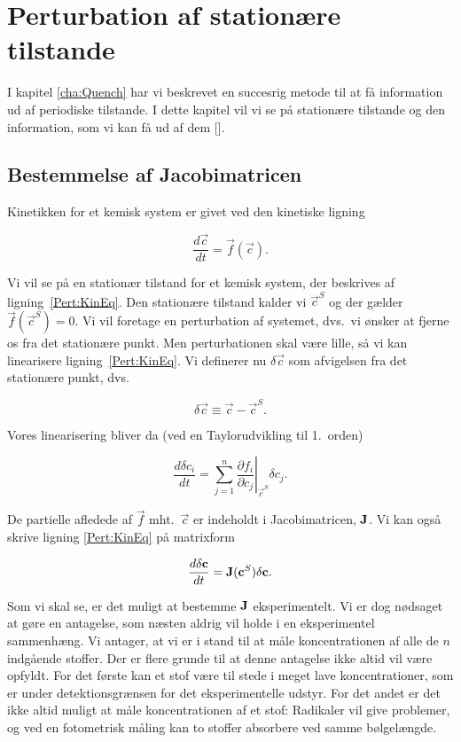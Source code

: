 \chapter{Perturbation af station{\ae}re tilstande}
\label{cha:PertStat}
I kapitel \ref{cha:Quench} har vi beskrevet en succesrig
metode til at f{\aa} information ud af periodiske
tilstande. I dette kapitel vil vi se p{\aa} station{\ae}re
tilstande og den information, som vi kan f{\aa} ud af dem
[].

\section{Bestemmelse af Jacobimatricen}
\label{Pert:jac}
Kinetikken for et kemisk system er givet ved den kinetiske
ligning

\begin{equation}
  \frac{d {\vec{c}} }{dt} = \vec{f}( \vec{c} ).
  \label{Pert:KinEq}
\end{equation}

Vi vil se p{\aa} en station{\ae}r tilstand for et kemisk
system, der beskrives af ligning~\ref{Pert:KinEq}. Den
station{\ae}re tilstand kalder vi $\vec{c}^S$ og der g{\ae}lder
$\vec{f}( \vec{c} ^S) = 0$. Vi vil foretage en perturbation af
systemet, dvs.\ vi {\o}nsker at fjerne os fra det
station{\ae}re punkt. Men perturbationen skal v{\ae}re
lille, s{\aa} vi kan linearisere ligning~\ref{Pert:KinEq}. Vi
definerer nu $\delta \vec{c}$ som afvigelsen fra det
station{\ae}re punkt, dvs.\

\begin{equation}
\delta \vec{c} \equiv \vec{c} - \vec{c}^S.
\end{equation}

Vores linearisering bliver da (ved en Taylorudvikling til
1.\ orden)

\begin{equation}
\label{Pert:Lin}
\frac{d\delta c_i}{dt} = \sum_{j=1}^n \left.\frac{\partial
f_i}{\partial c_j}\right|_{\vec{c}^S} \delta c_j.
\end{equation}

De partielle afledede af $\vec{f}$ mht.\ $\vec{c}$ er
indeholdt i Jacobimatricen, $\mbox{${\bf J}$}$. Vi kan ogs{\aa}
skrive ligning \ref{Pert:KinEq} p{\aa} matrixform

\[
\frac{d\delta\mbox{${\bf c}$}}{dt} = \mbox{${\bf J}$}(\mbox{${\bf c}$}^S)\delta\mbox{${\bf c}$}.
\]

Som vi skal se,  er det muligt at bestemme $\mbox{${\bf J}$}$
eksperimentelt. Vi er dog n{\o}dsaget at g{\o}re en
antagelse, som n\ae sten aldrig vil holde i en
eksperimentel sammenh{\ae}ng. Vi antager, at vi er i stand
til at m{\aa}le koncentrationen af alle de $n$
indg{\aa}ende stoffer. Der er flere grunde til at denne
antagelse ikke altid vil v{\ae}re opfyldt. For det f{\o}rste
kan et stof v{\ae}re til stede i meget lave
koncentrationer, som er under detektionsgr{\ae}nsen for det
eksperimentelle udstyr. For det andet er det ikke altid
muligt at m{\aa}le koncentrationen af et stof: Radikaler
vil give problemer, og ved en fotometrisk m{\aa}ling kan to
stoffer absorbere ved samme b{\o}lgel{\ae}ngde.

